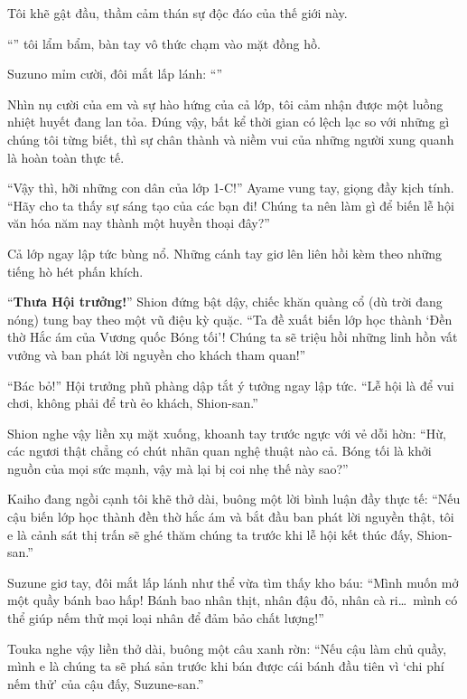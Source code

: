 \documentclass[../main.tex]{subfiles}
\begin{document}
Tôi khẽ gật đầu, thầm cảm thán sự độc đáo của thế giới này.

``'' tôi lẩm bẩm, bàn tay vô thức chạm vào mặt đồng hồ.

Suzuno mỉm cười, đôi mắt lấp lánh: ``''

Nhìn nụ cười của em và sự hào hứng của cả lớp, tôi cảm nhận được một luồng nhiệt huyết đang lan tỏa. Đúng vậy, bất kể thời gian có lệch lạc so với những gì chúng tôi từng biết, thì sự chân thành và niềm vui của những người xung quanh là hoàn toàn thực tế.

``Vậy thì, hỡi những con dân của lớp 1-C!'' Ayame vung tay, giọng đầy kịch tính. ``Hãy cho ta thấy sự sáng tạo của các bạn đi! Chúng ta nên làm gì để biến lễ hội văn hóa năm nay thành một huyền thoại đây?''

Cả lớp ngay lập tức bùng nổ. Những cánh tay giơ lên liên hồi kèm theo những tiếng hò hét phấn khích.

``\textbf{Thưa Hội trưởng!}'' Shion đứng bật dậy, chiếc khăn quàng cổ (dù trời đang nóng) tung bay theo một vũ điệu kỳ quặc. ``Ta đề xuất biến lớp học thành `Đền thờ Hắc ám của Vương quốc Bóng tối'! Chúng ta sẽ triệu hồi những linh hồn vất vưởng và ban phát lời nguyền cho khách tham quan!''

``Bác bỏ!'' Hội trưởng phũ phàng dập tắt ý tưởng ngay lập tức. ``Lễ hội là để vui chơi, không phải để trù ẻo khách, Shion-san.''

Shion nghe vậy liền xụ mặt xuống, khoanh tay trước ngực với vẻ dỗi hờn: ``Hừ, các ngươi thật chẳng có chút nhãn quan nghệ thuật nào cả. Bóng tối là khởi nguồn của mọi sức mạnh, vậy mà lại bị coi nhẹ thế này sao?''

Kaiho đang ngồi cạnh tôi khẽ thở dài, buông một lời bình luận đầy thực tế: ``Nếu cậu biến lớp học thành đền thờ hắc ám và bắt đầu ban phát lời nguyền thật, tôi e là cảnh sát thị trấn sẽ ghé thăm chúng ta trước khi lễ hội kết thúc đấy, Shion-san.''

Suzune giơ tay, đôi mắt lấp lánh như thể vừa tìm thấy kho báu: ``Mình muốn mở một quầy bánh bao hấp! Bánh bao nhân thịt, nhân đậu đỏ, nhân cà ri\dots\ mình có thể giúp nếm thử mọi loại nhân để đảm bảo chất lượng!''

Touka nghe vậy liền thở dài, buông một câu xanh rờn: ``Nếu cậu làm chủ quầy, mình e là chúng ta sẽ phá sản trước khi bán được cái bánh đầu tiên vì `chi phí nếm thử' của cậu đấy, Suzune-san.''
\end{document}
